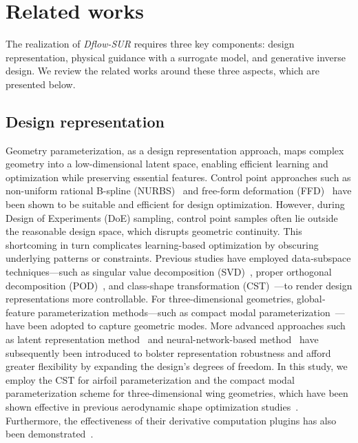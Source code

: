 \section{Related works}
\label{ch7:sect:relatedWork}
The realization of \textit{Dflow-SUR} requires three key components: design representation, physical guidance with a surrogate model, and generative inverse design. We review the related works around these three aspects, which are presented below.

\subsection{Design representation}
Geometry parameterization, as a design representation approach, maps complex geometry into a low-dimensional latent space, enabling efficient learning and optimization while preserving essential features. Control point approaches such as non-uniform rational B-spline (NURBS)~\cite{aa.Systemes2023,aa.Zhao2024} and free-form deformation (FFD)~\cite{aa.Sederberg1986,aa.Hajdik2023} have been shown to be suitable and efficient for design optimization. However, during Design of Experiments (DoE) sampling, control point samples often lie outside the reasonable design space, which disrupts geometric continuity. This shortcoming in turn complicates learning-based optimization by obscuring underlying patterns or constraints. Previous studies have employed data‐subspace techniques—such as singular value decomposition (SVD)~\cite{aa.Masters2017}, proper orthogonal decomposition (POD)~\cite{aa.Wu2019}, and class-shape transformation (CST)~\cite{aa.Kulfan2008}—to render design representations more controllable. For three-dimensional geometries, global‐feature parameterization methods—such as compact modal parameterization~\cite{aa.Li2021c}—have been adopted to capture geometric modes. More advanced approaches such as latent representation method~\cite{aa.Wei2023,aa.Wei2023b} and neural-network-based method~\cite{aa.Wei2024b,aa.Wei2025} have subsequently been introduced to bolster representation robustness and afford greater flexibility by expanding the design’s degrees of freedom. In this study, we employ the CST for airfoil parameterization and the compact modal parameterization scheme for three-dimensional wing geometries, 
which have been shown effective in previous aerodynamic shape optimization studies~\cite{aa.Lyu2024, aa.Yang2025b}. Furthermore, the effectiveness of their derivative computation plugins has also been demonstrated~\cite{aa.Li2021c,aa.Hajdik2023}. 



